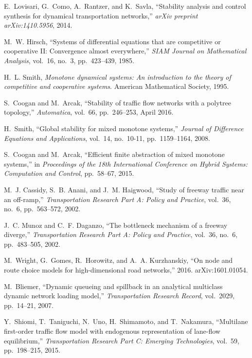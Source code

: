 \documentclass[letterpaper, 10 pt, conference]{ieeeconf}
\begin{document}

\begin{thebibliography}{10}

E.~Lovisari, G.~Como, A.~Rantzer, and K.~Savla, ``Stability analysis and
  control synthesis for dynamical transportation networks,'' {\em arXiv
  preprint arXiv:1410.5956}, 2014.

M.~W. Hirsch, ``Systems of differential equations that are competitive or
  cooperative {II}: Convergence almost everywhere,'' {\em SIAM Journal on
  Mathematical Analysis}, vol.~16, no.~3, pp.~423--439, 1985.

H.~L. Smith, {\em Monotone dynamical systems: {A}n introduction to the theory
  of competitive and cooperative systems}.
\newblock American Mathematical Society, 1995.

S.~Coogan and M.~Arcak, ``Stability of traffic flow networks with a polytree
  topology,'' {\em Automatica}, vol.~66, pp.~246--253, April 2016.

H.~Smith, ``Global stability for mixed monotone systems,'' {\em Journal of
  Difference Equations and Applications}, vol.~14, no.~10-11, pp.~1159--1164,
  2008.

S.~Coogan and M.~Arcak, ``Efficient finite abstraction of mixed monotone
  systems,'' in {\em Proceedings of the 18th International Conference on Hybrid
  Systems: Computation and Control}, pp.~58--67, 2015.

M.~J. Cassidy, S.~B. Anani, and J.~M. Haigwood, ``Study of freeway traffic near
  an off-ramp,'' {\em Transportation Research Part A: Policy and Practice},
  vol.~36, no.~6, pp.~563--572, 2002.

J.~C. Munoz and C.~F. Daganzo, ``The bottleneck mechanism of a freeway
  diverge,'' {\em Transportation Research Part A: Policy and Practice},
  vol.~36, no.~6, pp.~483--505, 2002.

M.~Wright, G.~Gomes, R.~Horowitz, and A.~A. Kurzhanskiy, ``On node and route
  choice models for high-dimensional road networks,'' 2016.
\newblock arXiv:1601.01054.

M.~Bliemer, ``Dynamic queueing and spillback in an analytical multiclass
  dynamic network loading model,'' {\em Transportation Research Record},
  vol.~2029, pp.~14--21, 2007.

Y.~Shiomi, T.~Taniguchi, N.~Uno, H.~Shimamoto, and T.~Nakamura, ``Multilane
  first-order traffic flow model with endogenous representation of lane-flow
  equilibrium,'' {\em Transportation Research Part C: Emerging Technologies},
  vol.~59, pp.~198--215, 2015.


\end{thebibliography}
\end{document}
